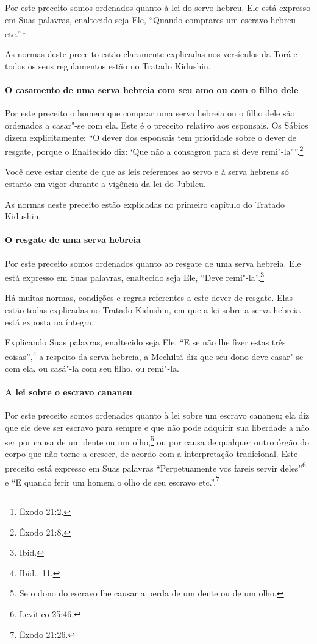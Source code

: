 \begin{multicols}{2}
Por este preceito somos ordenados quanto à lei do servo hebreu. Ele está
expresso em Suas palavras, enaltecido seja Ele, ``Quando comprares um
escravo hebreu etc.''.\footnote{Êxodo 21:2.}

As normas deste preceito estão claramente explicadas nos versículos da
Torá\starr{} e todos os seus regulamentos estão no Tratado Kidushin\starr.

\paragraph{O casamento de uma serva hebreia com seu amo ou com o filho dele}

Por este preceito o homem que comprar uma serva hebreia ou o filho dele
são ordenados a casar"-se com ela. Este é o preceito relativo aos
esponsais. Os Sábios dizem explicitamente: ``O dever dos esponsais tem
prioridade sobre o dever de resgate, porque o Enaltecido diz: `Que não a
consagrou para si deve remi"-la'\,''.\footnote{Êxodo 21:8.}

Você deve estar ciente de que as leis referentes ao servo e à serva
hebreus só estarão em vigor durante a vigência da lei do Jubileu.

As normas deste preceito estão explicadas no primeiro capítulo do
Tratado Kidushin\starr.

\paragraph{O resgate de uma serva hebreia}

Por este preceito somos ordenados quanto ao resgate de uma serva
hebreia. Ele está expresso em Suas palavras, enaltecido seja Ele, ``Deve
remi"-la''.\footnote{Ibid.}

Há muitas normas, condições e regras referentes a este dever de
resgate. Elas estão todas explicadas no Tratado Kidushin\starr, em que a lei
sobre a serva hebreia está exposta na íntegra.

Explicando Suas palavras, enaltecido seja Ele, ``E se não lhe fizer
estas três coisas'',\footnote{Ibid., 11.} a respeito da serva hebreia, a
Mechiltá\starr{} diz que seu dono deve casar"-se com ela, ou casá"-la com seu
filho, ou remi"-la.

\paragraph{A lei sobre o escravo cananeu}

Por este preceito somos ordenados quanto à lei sobre um escravo cananeu;
ela diz que ele deve ser escravo para sempre e que não pode adquirir sua
liberdade a não ser por causa de um dente ou um
olho,\footnote{Se o dono do escravo lhe causar a perda de um dente ou de um olho.} ou por causa de qualquer outro órgão do
corpo que não torne a crescer, de acordo com a interpretação
tradicional. Este preceito está expresso em Suas palavras
``Perpetuamente vos fareis servir deles''\footnote{Levítico 25:46.} e ``E quando
ferir um homem o olho de seu escravo etc.''.\footnote{Êxodo 21:26.}


\end{multicols}
